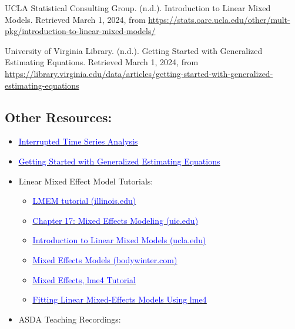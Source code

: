 \documentclass[
]{article}
\providecommand{\tightlist}{%
  \setlength{\itemsep}{0pt}\setlength{\parskip}{0pt}}
\begin{document}
UCLA Statistical Consulting Group. (n.d.). Introduction to Linear Mixed Models. Retrieved March 1, 2024, from \url{https://stats.oarc.ucla.edu/other/mult-pkg/introduction-to-linear-mixed-models/}

University of Virginia Library. (n.d.). Getting Started with Generalized Estimating Equations. Retrieved March 1, 2024, from \url{https://library.virginia.edu/data/articles/getting-started-with-generalized-estimating-equations}

\hypertarget{other-resources}{%
\subsection{Other Resources:}\label{other-resources}}

\begin{itemize}
\tightlist
\item
  \href{https://rpubs.com/mbounthavong/MEPS_tutorial_6_itsa}{\underline{\textcolor{blue}{Interrupted Time Series Analysis}}}
\item
  \href{https://library.virginia.edu/data/articles/getting-started-with-generalized-estimating-equations\#:~:text=Generalized\%20estimating\%20equations\%2C\%20or\%20GEE,(i.e.\%2C\%20model\%20coefficients).}{\underline{\textcolor{blue}{Getting Started with Generalized Estimating Equations}}}
\item
  Linear Mixed Effect Model Tutorials:

  \begin{itemize}
  \tightlist
  \item
    \href{https://jontalle.web.engr.illinois.edu/MISC/lme4/bw_LME_tutorial.pdf}{\underline{\textcolor{blue}{LMEM tutorial (illinois.edu)}}}
  \item
    \href{https://ademos.people.uic.edu/Chapter17.html}{\underline{\textcolor{blue}{Chapter 17: Mixed Effects Modeling (uic.edu)}}}
  \item
    \href{https://stats.idre.ucla.edu/other/mult-pkg/introduction-to-linear-mixed-models/}{\underline{\textcolor{blue}{Introduction to Linear Mixed Models (ucla.edu)}}}
  \item
    \href{https://bodo-winter.net/tutorial/bw_LME_tutorial1.pdf}{\underline{\textcolor{blue}{Mixed Effects Models (bodywinter.com)}}}
  \item
    \href{https://ourcodingclub.github.io/tutorials/mixed-models/}{\underline{\textcolor{blue}{Mixed Effects, lme4 Tutorial}}}
  \item
    \href{https://cran.r-project.org/web/packages/lme4/vignettes/lmer.pdf}{\underline{\textcolor{blue}{Fitting Linear Mixed-Effects Models Using lme4}}}
  \end{itemize}
\item
  ASDA Teaching Recordings:


\end{itemize}
\end{document}
